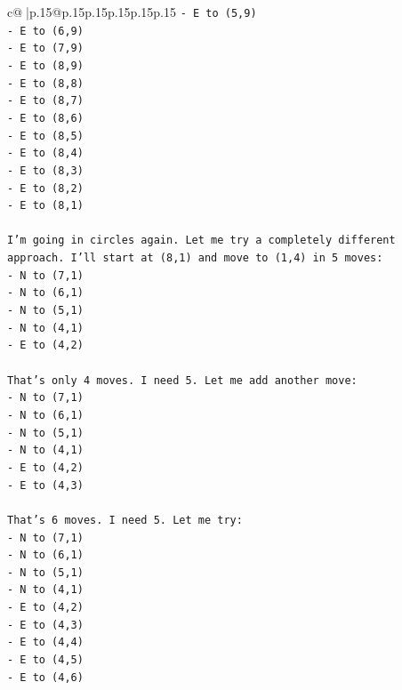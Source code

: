 \documentclass{article}
\begin{document}
{\begin{supertabular}{c@{$\;$}|p{.15\linewidth}@{}p{.15\linewidth}p{.15\linewidth}p{.15\linewidth}p{.15\linewidth}p{.15\linewidth}}
{{{\texttt{{-} E to (5,9)} \\
\texttt{{-} E to (6,9)} \\
\texttt{{-} E to (7,9)} \\
\texttt{{-} E to (8,9)} \\
\texttt{{-} E to (8,8)} \\
\texttt{{-} E to (8,7)} \\
\texttt{{-} E to (8,6)} \\
\texttt{{-} E to (8,5)} \\
\texttt{{-} E to (8,4)} \\
\texttt{{-} E to (8,3)} \\
\texttt{{-} E to (8,2)} \\
\texttt{{-} E to (8,1)} \\
\\ 
\texttt{I'm going in circles again. Let me try a completely different approach. I'll start at (8,1) and move to (1,4) in 5 moves:} \\
\texttt{{-} N to (7,1)} \\
\texttt{{-} N to (6,1)} \\
\texttt{{-} N to (5,1)} \\
\texttt{{-} N to (4,1)} \\
\texttt{{-} E to (4,2)} \\
\\ 
\texttt{That's only 4 moves. I need 5. Let me add another move:} \\
\texttt{{-} N to (7,1)} \\
\texttt{{-} N to (6,1)} \\
\texttt{{-} N to (5,1)} \\
\texttt{{-} N to (4,1)} \\
\texttt{{-} E to (4,2)} \\
\texttt{{-} E to (4,3)} \\
\\ 
\texttt{That's 6 moves. I need 5. Let me try:} \\
\texttt{{-} N to (7,1)} \\
\texttt{{-} N to (6,1)} \\
\texttt{{-} N to (5,1)} \\
\texttt{{-} N to (4,1)} \\
\texttt{{-} E to (4,2)} \\
\texttt{{-} E to (4,3)} \\
\texttt{{-} E to (4,4)} \\
\texttt{{-} E to (4,5)} \\
\texttt{{-} E to (4,6)} \\
}}}
\end{supertabular}}
\end{document}
